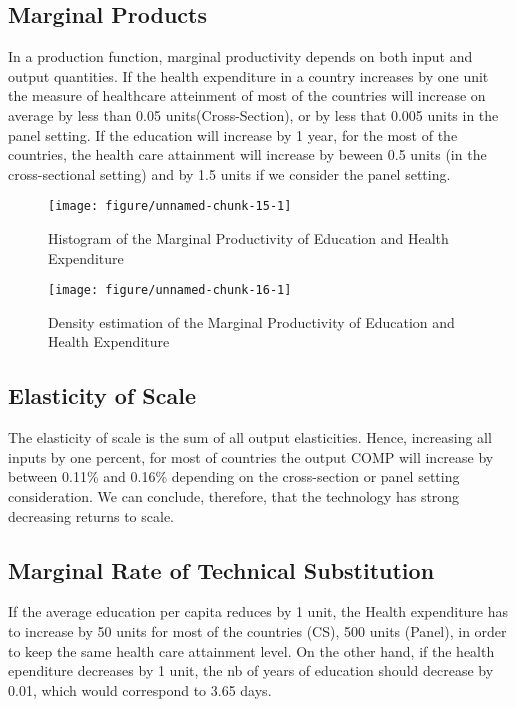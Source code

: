 \documentclass[12pt,a4paper]{article}\usepackage[]{graphicx}\usepackage[]{color}
\makeatletter
\def\maxwidth{ %
  \ifdim\Gin@nat@width>\linewidth
    \linewidth
  \else
    \Gin@nat@width
  \fi
}
\newenvironment{knitrout}{}{} %
\makeatother
\begin{document}
\subsection{Marginal Products}
In a production function, marginal productivity depends on both input and output 
quantities. 
If the health expenditure in a country increases  by one unit 
the measure of healthcare atteinment of most of the countries 
will increase on average by less than 0.05 units(Cross-Section), or by less that  0.005 units in the panel setting.
If the education will increase by 1 year, for the most of the countries, the 
health care attainment will increase by beween 0.5 units (in the cross-sectional setting) and by 1.5 units if we consider the panel setting.
\begin{knitrout}
\color{fgcolor}\begin{figure}
\texttt{[image: figure/unnamed-chunk-15-1]} \caption[Histogram of the Marginal Productivity of Education and Health Expenditure]{Histogram of the Marginal Productivity of Education and Health Expenditure}\label{fig:unnamed-chunk-15}
\end{figure}


\end{knitrout}
\begin{knitrout}
\color{fgcolor}\begin{figure}
\texttt{[image: figure/unnamed-chunk-16-1]} \caption[Density estimation of the Marginal Productivity of Education and Health Expenditure]{Density estimation of the Marginal Productivity of Education and Health Expenditure}\label{fig:unnamed-chunk-16}
\end{figure}


\end{knitrout}
\subsection{Elasticity of Scale}


The elasticity of scale is the sum of all output elasticities. Hence, increasing all  inputs by one percent, for most of countries
the output COMP will increase by between 0.11\% and 0.16\% depending on the cross-section or panel setting consideration.
We can conclude, therefore, that the technology has strong decreasing returns to scale.

\subsection{Marginal Rate of Technical Substitution}
If the average education per capita reduces by 1 unit, the Health expenditure has to increase by 50 units for most of the countries (CS), 500 units (Panel), in order to keep the same health care attainment level.
On the other hand, if the health ependiture decreases by 1 unit, the nb of years of education should decrease by 0.01, which would correspond to 3.65 days.
\end{document}
